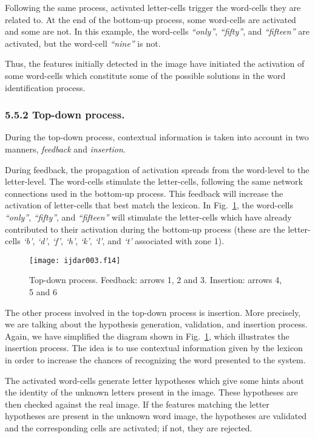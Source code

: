 \documentclass[ijdar]{svjour}
\begin{document}
Following the same process, activated letter-cells trigger the word-cells they are related to.
At the end of the bottom-up process, some word-cells are activated and some are not.
In this example, the word-cells {\it ``only''}, {\it ``fifty''}, and
{\it ``fifteen''} are activated, but the word-cell\break
{\it ``nine''} is not.

Thus, the features initially detected in the image have initiated the activation of some word-cells which constitute some of the possible solutions in the word identification process.


\subsubsection{5.5.2 Top-down process.}
\label{SECPDES}


During the top-down process, contextual information is taken into account in two manners, {\it feedback} and {\it insertion}.


During feedback, the propagation of activation\break
spreads from the word-level to the letter-level.
The word-cells stimulate the letter-cells, following the same network connections used in the bottom-up process.
This feedback will increase the activation of letter-cells that best match the lexicon.
In Fig.~\ref{FIGDES}, the word-cells {\it ``only''}, {\it ``fifty''},
and  {\it ``fifteen''} will stimulate the letter-cells which have already contributed to their activation during the bottom-up process (these are the letter-cells {\it `b'}, {\it `d'}, {\it `f'}, {\it `h'}, {\it `k'}, {\it
`l'}, and {\it `t'} associated with zone 1).

\begin{figure}%
\texttt{[image: ijdar003.f14]}%
\caption{Top-down process. Feedback: arrows 1, 2 and 3. Insertion:
arrows 4, 5 and 6}
\label{FIGDES}
\end{figure}

The other process involved in the top-down process is insertion.
More precisely, we are talking about the hypothesis generation,
validation, and insertion process.
Again, we have simplified the diagram shown in Fig.~\ref{FIGDES}, which illustrates the insertion process.
The idea is to use contextual information given by the lexicon in order to increase the chances of recognizing the word presented to the system.

The activated word-cells generate letter hypotheses which give some hints about the identity of the unknown letters present in the image.
These hypotheses are then checked against the real image.
If the features matching the letter hypotheses are present in the unknown word image, the hypotheses are validated and the corresponding cells are activated; if not, they are rejected.
\end{document}
